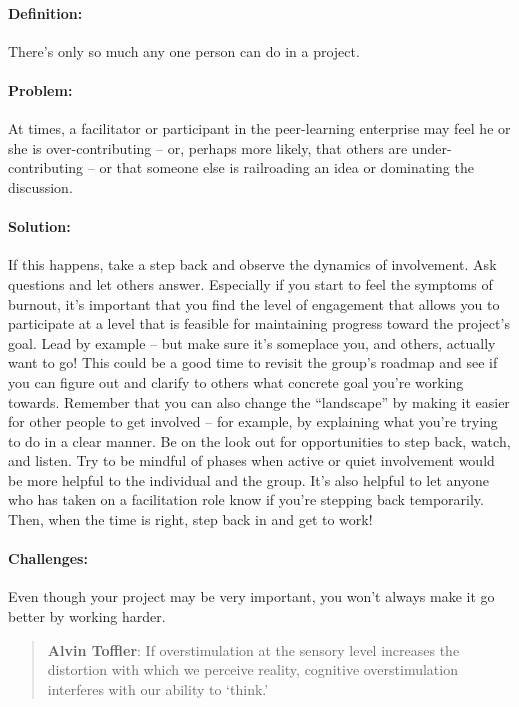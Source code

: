 \paragraph{Definition:} There's only so much any one person can do in a
project.

\paragraph{Problem:} At times, a facilitator or participant in the
peer-learning enterprise may feel he or she is over-contributing -- or,
perhaps more likely, that others are under-contributing -- or that
someone else is railroading an idea or dominating the discussion.

\paragraph{Solution:} If this happens, take a step back and observe the
dynamics of involvement. Ask questions and let others answer. Especially
if you start to feel the symptoms of burnout, it's important that you
find the level of engagement that allows you to participate at a level
that is feasible for maintaining progress toward the project's goal.
Lead by example -- but make sure it's someplace you, and others,
actually want to go! This could be a good time to revisit the group's
roadmap and see if you can figure out and clarify to others what
concrete goal you're working towards. Remember that you can also change
the ``landscape'' by making it easier for other people to get involved
-- for example, by explaining what you're trying to do in a clear
manner. Be on the look out for opportunities to step back, watch, and
listen. Try to be mindful of phases when active or quiet involvement
would be more helpful to the individual and the group. It's also helpful
to let anyone who has taken on a facilitation role know if you're
stepping back temporarily. Then, when the time is right, step back in
and get to work!

\paragraph{Challenges:} Even though your project may be very important, you
won't always make it go better by working harder.

\begin{quote}
\textbf{Alvin Toffler}: If overstimulation at the sensory level
increases the distortion with which we perceive reality, cognitive
overstimulation interferes with our ability to `think.'
\end{quote}

